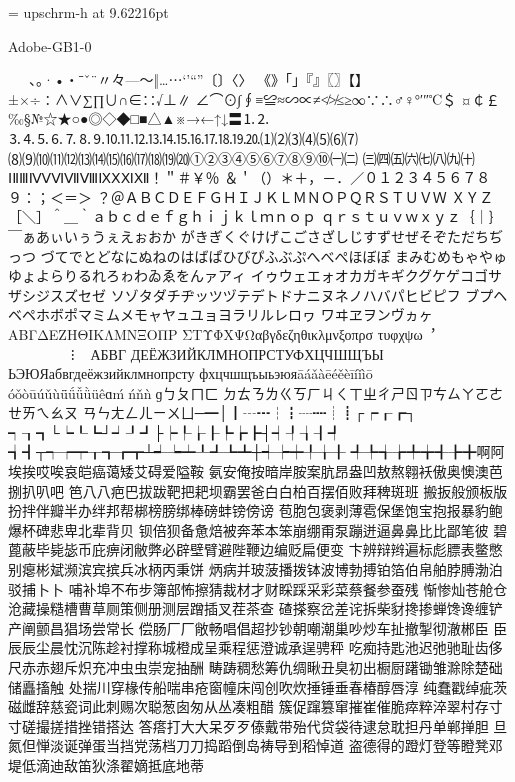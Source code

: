 %
%
%
%
\font\upschrm = upschrm-h at 9.62216pt
\upschrm


Adobe-GB1-0

 　、。·•・ˉˇ¨〃々—～‖…⋯‘’“”〔〕〈〉
《》「」『』〖〗【】±×÷∶∧∨∑∏∪∩∈∷√⊥∥
∠⌒⊙∫∮≡≌≈∽∝≠≮≯≤≥∞∵∴♂♀°′″℃＄
¤￠￡‰§№☆★○●◎◇◆□■△▲※→←↑↓〓⒈⒉
⒊⒋⒌⒍⒎⒏⒐⒑⒒⒓⒔⒕⒖⒗⒘⒙⒚⒛⑴⑵⑶⑷⑸⑹⑺
⑻⑼⑽⑾⑿⒀⒁⒂⒃⒄⒅⒆⒇①②③④⑤⑥⑦⑧⑨⑩㈠㈡
㈢㈣㈤㈥㈦㈧㈨㈩ⅠⅡⅢⅣⅤⅥⅦⅧⅨⅩⅪⅫ！＂＃￥％
＆＇（）＊＋，－．／０１２３４５６７８９：；＜＝＞
？＠ＡＢＣＤＥＦＧＨＩＪＫＬＭＮＯＰＱＲＳＴＵＶＷ
ＸＹＺ［＼］＾＿｀ａｂｃｄｅｆｇｈｉｊｋｌｍｎｏｐ
ｑｒｓｔｕｖｗｘｙｚ｛｜｝￣ぁあぃいぅうぇえぉおか
がきぎくぐけげこごさざしじすずせぜそぞただちぢっつ
づてでとどなにぬねのはばぱひびぴふぶぷへべぺほぼぽ
まみむめもゃやゅゆょよらりるれろゎわゐゑをんァアィ
イゥウェエォオカガキギクグケゲコゴサザシジスズセゼ
ソゾタダチヂッツヅテデトドナニヌネノハバパヒビピフ
ブプヘベペホボポマミムメモャヤュユョヨラリルレロヮ
ワヰヱヲンヴヵヶΑΒΓΔΕΖΗΘΙΚΛΜΝΞΟΠΡ
ΣΤΥΦΧΨΩαβγδεζηθικλμνξοπρσ
τυφχψω︐︒︑︓︔︕︖︵︶︹︺︿
﹀︽︾﹁﹂﹃﹄︗︘︻︼︷︸︱⁝︙︳︴АБВГ
ДЕЁЖЗИЙКЛМНОПРСТУФХЦЧШЩЪЫ
ЬЭЮЯабвгдеёжзийклмнопрсту
фхцчшщъыьэюяāáǎàēéěèīíǐìō
óǒòūúǔùǖǘǚǜüêɑḿńňǹɡㄅㄆㄇㄈ
ㄉㄊㄋㄌㄍㄎㄏㄐㄑㄒㄓㄔㄕㄖㄗㄘㄙㄚㄛㄜㄝㄞㄟㄠㄡ
ㄢㄣㄤㄥㄦㄧㄨㄩ─━│┃┄┅┆┇┈┉┊┋┌┍┎┏┐
┑┒┓└┕┖┗┘┙┚┛├┝┞┟┠┡┢┣┤┥┦┧┨┩
┪┫┬┭┮┯┰┱┲┳┴┵┶┷┸┹┺┻┼┽┾┿╀╁╂
╃╄╅╆╇╈╉╊╋啊阿埃挨哎唉哀皑癌蔼矮艾碍爱隘鞍
氨安俺按暗岸胺案肮昂盎凹敖熬翱袄傲奥懊澳芭捌扒叭吧
笆⼋八疤巴拔跋靶把耙坝霸罢爸⽩白柏百摆佰败拜稗斑班
搬扳般颁板版扮拌伴瓣半办绊邦帮梆榜膀绑棒磅蚌镑傍谤
苞胞包褒剥薄雹保堡饱宝抱报暴豹鲍爆杯碑悲卑北辈背贝
钡倍狈备惫焙被奔苯本笨崩绷甭泵蹦迸逼⿐鼻⽐比鄙笔彼
碧蓖蔽毕毙毖币庇痹闭敝弊必辟壁臂避陛鞭边编贬扁便变
卞辨辩辫遍标彪膘表鳖憋别瘪彬斌濒滨宾摈兵冰柄丙秉饼
炳病并玻菠播拨钵波博勃搏铂箔伯帛舶脖膊渤泊驳捕⼘卜
哺补埠不布步簿部怖擦猜裁材才财睬踩采彩菜蔡餐参蚕残
惭惨灿苍舱仓沧藏操糙槽曹草厕策侧册测层蹭插叉茬茶查
碴搽察岔差诧拆柴豺搀掺蝉馋谗缠铲产阐颤昌猖场尝常长
偿肠⼚厂敞畅唱倡超抄钞朝嘲潮巢吵炒车扯撤掣彻澈郴⾂
臣⾠辰尘晨忱沉陈趁衬撑称城橙成呈乘程惩澄诚承逞骋秤
吃痴持匙池迟弛驰耻齿侈尺⾚赤翅斥炽充冲⾍虫崇宠抽酬
畴踌稠愁筹仇绸瞅丑臭初出橱厨躇锄雏滁除楚础储矗搐触
处揣川穿椽传船喘串疮窗幢床闯创吹炊捶锤垂春椿醇唇淳
纯蠢戳绰疵茨磁雌辞慈瓷词此刺赐次聪葱囱匆从丛凑粗醋
簇促蹿篡窜摧崔催脆瘁粹淬翠村存⼨寸磋撮搓措挫错搭达
答瘩打⼤大呆⽍歹傣戴带殆代贷袋待逮怠耽担丹单郸掸胆
旦氮但惮淡诞弹蛋当挡党荡档⼑刀捣蹈倒岛祷导到稻悼道
盗德得的蹬灯登等瞪凳邓堤低滴迪敌笛狄涤翟嫡抵底地蒂
